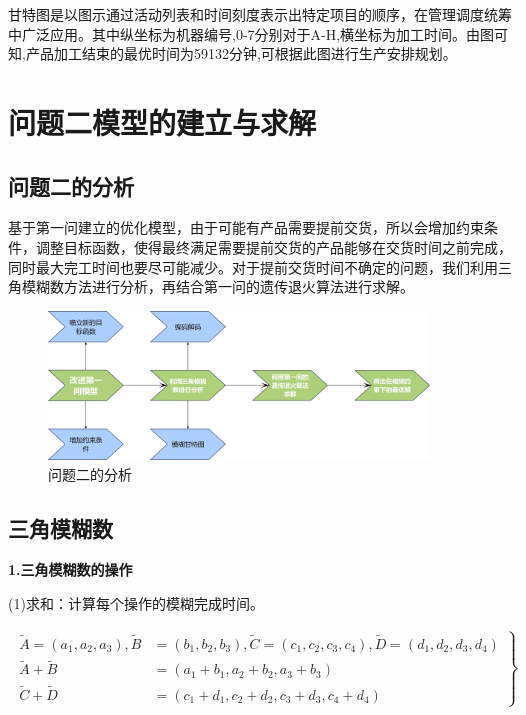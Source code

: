 \documentclass{whutmod}
\begin{document}
\begin{spacing}{1.2}
 甘特图是以图示通过活动列表和时间刻度表示出特定项目的顺序，在管理调度统筹中广泛应用。其中纵坐标为机器编号,0-7分别对于A-H,横坐标为加工时间。由图可知,产品加工结束的最优时间为59132分钟,可根据此图进行生产安排规划。

 
    
	\section{问题二模型的建立与求解}
    \subsection{问题二的分析}
    
    基于第一问建立的优化模型，由于可能有产品需要提前交货，所以会增加约束条件，调整目标函数，使得最终满足需要提前交货的产品能够在交货时间之前完成，同时最大完工时间也要尽可能减少。对于提前交货时间不确定的问题，我们利用三角模糊数方法进行分析，再结合第一问的遗传退火算法进行求解。
    
    
    \begin{figure}[H]
        \centering
        \includegraphics[width=0.9\textwidth]{流程2.jpg}
        \caption{问题二的分析}
    \end{figure}
    
   
    
    \subsection{三角模糊数}
    	
    		\textbf{1.三角模糊数的操作}
      
    		(1)求和：计算每个操作的模糊完成时间。
      
 \begin{gather}
\left.\begin{array}{rl}
\widetilde{A}=\left(a_1, a_2, a_3\right), \widetilde{B} & =\left(b_1, b_2, b_3\right), \widetilde{C}=\left(c_1, c_2, c_3, c_4\right), \widetilde{D}=\left(d_1, d_2, d_3, d_4\right) \\
\widetilde{A}+\widetilde{B} & =\left(a_1+b_1, a_2+b_2, a_3+b_3\right) \\
\widetilde{C}+\widetilde{D} & =\left(c_1+d_1, c_2+d_2, c_3+d_3, c_4+d_4\right)
\end{array}\right\}
\end{gather}


\end{spacing}
\end{document}
